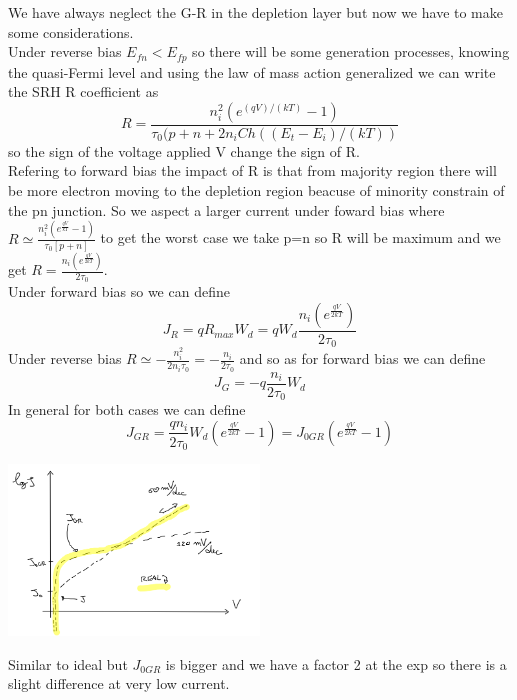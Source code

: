 We have always neglect the G-R in the depletion layer but now we have to make some considerations.\\
Under reverse bias $E_{fn}<E_{fp}$ so there will be some generation processes, knowing the quasi-Fermi level and using the law of mass action generalized we can write the SRH R coefficient as
\begin{equation}
R=\frac{n_i^2(e^{(qV)/(kT)}-1)}{\tau_0(p+n+2n_i Ch((E_t-E_i)/(kT))}
\end{equation} 
so the sign of the voltage applied V change the sign of R.\\
Refering to forward bias the impact of R is that from majority region there will be more electron moving to the depletion region beacuse of minority constrain of the pn junction. 
So we aspect a larger current under foward bias where $R\simeq \frac{n_i^2(e^{\frac{qV}{kT}}-1)}{\tau_0[p+n]}$ to get the worst case we take p=n so R will be maximum and we get $R= \frac{n_i(e^{\frac{qV}{2kT}})}{2\tau_0}$.\\
Under forward bias so we can define 
\begin{equation}
J_R=qR_{max}W_d=qW_d\frac{n_i(e^{\frac{qV}{2kT}})}{2\tau_0}
\end{equation}
Under reverse bias $R\simeq -\frac{n_i^2}{2n_i\tau_0}=-\frac{n_i}{2\tau_0}$ and so as for forward bias we can define
\begin{equation}
J_G=-q\frac{n_i}{2\tau_0}W_d
\end{equation}
In general for both cases we can define 
\begin{equation}
J_{GR}=\frac{qn_i}{2\tau_0}W_d(e^{\frac{qV}{2kT}}-1)=J_{0GR}(e^{\frac{qV}{2kT}}-1)
\end{equation}

\centering
\includegraphics[width=0.5\textwidth]{lowcurrent.png}\\
\raggedright

Similar to ideal but $J_{0GR}$ is bigger and we have a factor 2 at the exp so there is a slight difference at very low current.


